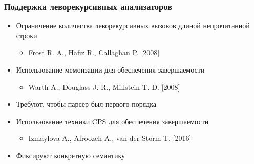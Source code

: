\documentclass{beamer}
\begin{document}
\begin{frame}[fragile]
  \transwipe[direction=90]
  \frametitle{Поддержка леворекурсивных анализаторов}
  \begin{itemize} %
    \item Ограничение количества леворекурсивных вызовов длиной непрочитанной строки
    \begin{itemize}
      \item Frost R. A., Hafiz R., Callaghan P. [2008] %
    \end{itemize}
    \item Использование мемоизации для обеспечения завершаемости
    \begin{itemize}
      \item Warth A., Douglass J. R., Millstein T. D. [2008] %
    \end{itemize}

    \item Требуют, чтобы парсер был первого порядка
  \end{itemize}

  \begin{itemize}
    \item Использование техники CPS для обеспечения завершаемости
    \begin{itemize}
      \item Izmaylova	A., Afroozeh A., van der Storm T. [2016] %
    \end{itemize}

    \item Фиксируют конкретную семантику
  \end{itemize}  

\end{frame}

\end{document}
